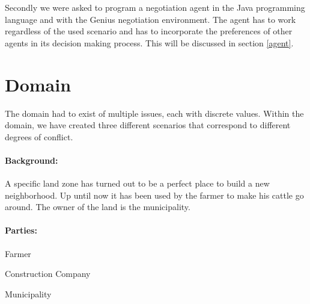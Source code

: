 \documentclass[a4,11pt]{scrartcl}
\let\tempone\itemize
\let\temptwo\enditemize
\renewenvironment{itemize}{\tempone\addtolength{\itemsep}{-0.5\baselineskip}}{\temptwo}
\begin{document}
    Secondly we were asked to program a negotiation agent in the Java 
    programming language and with the {\sc Genius} negotiation 
    environment. The agent has to work regardless of the used scenario 
    and has to incorporate the preferences of other agents in its 
    decision making process. This will be discussed in section 
    \ref{agent}.


\section{Domain}\label{domain}

    The domain had to exist of multiple issues, each with discrete values.
    Within the domain, we have created three different scenarios that
    correspond to different degrees of conflict.
    
    \paragraph{Background:}
    A specific land zone has turned out to be a perfect place to build 
    a new neighborhood. Up until now it has been used by the farmer to 
    make his cattle go around. The owner of the land is the 
    municipality.

    \paragraph{Parties:}
    \begin{itemize}
        \item Farmer
        \item Construction Company
        \item Municipality
    \end{itemize}
\end{document}
